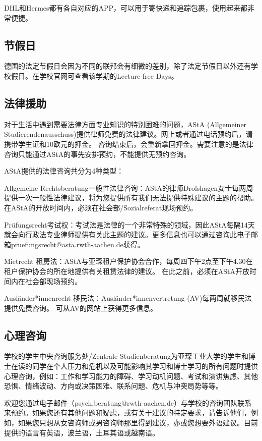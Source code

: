     DHL和Hermes都有各自对应的APP，可以用于寄快递和追踪包裹，使用起来都非常便捷。

  \subsection{节假日}

    德国的法定节假日会因为不同的联邦会有细微的差别，除了法定节假日以外还有学校假日。在学校官网可查看该学期的Lecture-free Days。

  \subsection{法律援助}

    对于生活中遇到需要法律方面专业知识的特别困难的问题，AStA (Allgemeiner Studierendenausschuss)提供律师免费的法律建议。网上或者通过电话预约后，请携带学生证和10欧元的押金。 咨询结束后，会重新拿回押金。需要注意的是法律咨询只能通过AStA的事先安排预约，不能提供无预约咨询。

    AStA提供的法律咨询共分为4种类型：

    Allgemeine Rechtsberatung一般性法律咨询：AStA的律师Drolshagen女士每两周提供一次一般性法律建议，将为您提供所有我们无法提供特殊建议的主题的帮助。 在AStA的开放时间内，必须在社会部/Sozialreferat现场预约。

    Prüfungsrecht考试权：考试法是法律的一个非常特殊的领域，因此AStA每隔14天就会向行政法专业律师提供有关此主题的建议。更多信息也可以通过咨询此电子邮箱pruefungsrecht@asta.rwth-aachen.de获得。

    Mietrecht 租房法：AStA与亚琛租户保护协会合作，每周四下午2点至下午4.30在租户保护协会的所在地提供有关租赁法律的建议。 在此之前，必须在AStA开放时间内在社会部现场预约。

    Ausländer*innenrecht 移民法：Ausländer*innenvertretung (AV)每两周就移民法提供免费咨询。 可从AV的网站上获得更多信息。

  \subsection{心理咨询}

    学校的学生中央咨询服务处/Zentrale Studienberatung为亚琛工业大学的学生和博士在读的同学在个人压力和危机以及可能影响其学习和博士学习的所有问题时提供心理咨询，例如：工作和学习能力的障碍、学习动机问题、考试和演讲焦虑、其他恐惧、情绪波动、方向或决策困难、联系问题、危机与冲突局势等等。

    欢迎您通过电子邮件（psych.beratung@rwth-aachen.de）与学校的咨询团队联系来预约。如果您还有其他问题和疑虑，或有关于建议的特定要求，请告诉他们，例如，如果您只想从女咨询师或男咨询师那里得到建议，亦或您想要外语建议。目前提供的语言有英语，波兰语，土耳其语或越南语。

